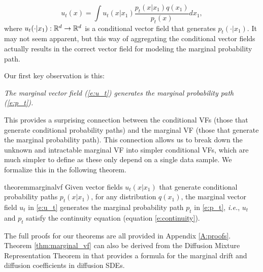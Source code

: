 \documentclass{article}
\makeatletter
\renewcommand*{\ie}{{\it i.e.}\@\xspace}
\makeatother
\begin{document}
%
\begin{equation}\label{e:u_t}
    u_t(x) 
    = \int u_t(x\vert x_1) \frac{p_t(x\vert x_1)q(x_1)}{p_t(x)}dx_1,
\end{equation}
where $u_t(\cdot|x_1):\mathbb R^d\rightarrow\mathbb R^d$ is a conditional vector field that generates $p_t(\cdot\vert x_1)$. It may not seem apparent, but this way of aggregating the conditional vector fields actually results in the correct vector field for modeling the marginal probability path.

Our first key observation is this:
\vspace{-0.5em}
\begin{center}			%
    \colorbox{mygray} {		%
      \begin{minipage}{0.977\linewidth} 	%
       \centering
        \emph{The marginal vector field (\eqref{e:u_t}) generates the marginal probability path (\eqref{e:p_t}).}
      \end{minipage}}			%
\end{center}
This provides a surprising connection between the conditional VFs (those that generate conditional probability paths) and the marginal VF (those that generate the marginal probability path). This connection allows us to break down the unknown and intractable marginal VF into simpler conditional VFs, which are much simpler to define as these only depend on a single data sample. We formalize this in the following theorem.
\begin{restatable}{theorem}{marginalvf}\label{thm:marginal_vf}
Given vector fields $u_t(x|x_1)$ that generate conditional probability paths $p_t(x|x_1)$, for any distribution $q(x_1)$, the marginal vector field $u_t$ in \eqref{e:u_t} generates the marginal probability path $p_t$ in \eqref{e:p_t}, \ie, $u_t$ and $p_t$ satisfy the continuity equation (equation \ref{e:continuity}).
\end{restatable}
The full proofs for our theorems are all provided in Appendix \ref{A:proofs}. Theorem \ref{thm:marginal_vf} can also be derived from the Diffusion Mixture Representation Theorem in \cite{peluchetti2021non} that provides a formula for the marginal drift and diffusion coefficients in diffusion SDEs.
\end{document}
